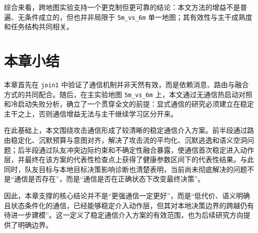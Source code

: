综合来看，跨地图实验支持一个更克制但更可靠的结论：本文方法的增益不是普遍、无条件成立的，但也并非局限于 \texttt{5m\_vs\_6m} 单一地图；其有效性与主干成熟度和任务结构共同相关。

\section{本章小结}

本章首先在 \texttt{join1} 中验证了通信机制并非天然有效，而是依赖消息、路由与融合方式的共同配合。随后，在主实验地图 \texttt{5m\_vs\_6m} 上，本文通过无通信热启动对照和冷启动失败分析，确立了一个贯穿全文的前提：显式通信的研究必须建立在稳定主干之上，否则通信增益无法与主干继续学习区分开来。

在此基础上，本文围绕攻击通信形成了较清晰的稳定通信介入方案。前半段通过路由稳定化、沉默预算与意图对齐，解决了攻击流的平均化、沉默逃逸和语义空洞问题；后半段通过队友冲突边际约束和不确定性融合暴露，使通信首次稳定进入动作层，并最终在该方案的代表性检查点上获得了健康参数区间下的代表性结果。与此同时，队友目标与本地目标决策影响诊断也清楚表明，当前尚未彻底解决的问题不是“通信是否存在”，而是“通信是否在正确状态下改变最终决策”。

因此，本章支撑的核心结论并不是“更强通信一定更好”，而是“低代价、语义明确且状态条件化的通信，已经能够稳定介入动作层，但其对本地决策边界的跨越仍有待进一步建模”。这一定义了稳定通信介入方案的有效范围，也为后续研究方向提供了明确边界。
